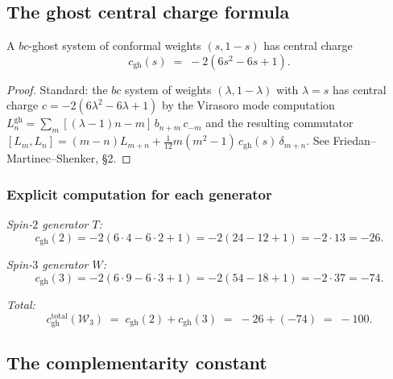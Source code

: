\documentclass[11pt]{article}
\newcommand{\cW}{\mathcal{W}}
\begin{document}
\subsection{The ghost central charge formula}

\begin{proposition}
\label{prop:ghost-central-charge}
A $bc$-ghost system of conformal weights $(s, 1-s)$ has central
charge
\begin{equation}\label{eq:ghost-cc}
c_{\mathrm{gh}}(s) \;=\; -2(6s^2 - 6s + 1).
\end{equation}
\end{proposition}

\begin{proof}
Standard: the $bc$ system of weights $(\lambda, 1-\lambda)$ with
$\lambda = s$ has central charge $c = -2(6\lambda^2 - 6\lambda + 1)$
by the Virasoro mode computation $L_n^{\mathrm{gh}}
= \sum_m [(\lambda-1)n - m]\,b_{n+m}\,c_{-m}$ and the resulting
commutator $[L_m, L_n] = (m-n)L_{m+n}
+ \frac{1}{12}m(m^2-1)\,c_{\mathrm{gh}}(s)\,\delta_{m+n}$.
See Friedan--Martinec--Shenker, \S2.
\end{proof}

\subsubsection{Explicit computation for each generator}

\emph{Spin-$2$ generator $T$:}
\begin{equation}
c_{\mathrm{gh}}(2) = -2(6 \cdot 4 - 6 \cdot 2 + 1) = -2(24 - 12 + 1) = -2 \cdot 13 = -26.
\end{equation}

\emph{Spin-$3$ generator $W$:}
\begin{equation}
c_{\mathrm{gh}}(3) = -2(6 \cdot 9 - 6 \cdot 3 + 1) = -2(54 - 18 + 1) = -2 \cdot 37 = -74.
\end{equation}

\emph{Total:}
\begin{equation}\label{eq:W3-ghost-total}
c_{\mathrm{gh}}^{\mathrm{total}}(\cW_3)
\;=\;
c_{\mathrm{gh}}(2) + c_{\mathrm{gh}}(3)
\;=\;
-26 + (-74) \;=\; -100.
\end{equation}

\subsection{The complementarity constant}
\end{document}
